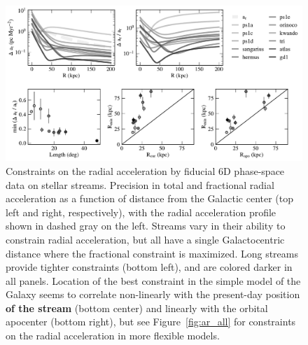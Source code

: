 \documentclass[modern]{aastex62}
\begin{document}
\begin{figure}
\begin{center}
\includegraphics[width=\textwidth]{ar_crb.pdf}
\caption{Constraints on the radial acceleration by fiducial 6D phase-space data on stellar streams.
Precision in total and fractional radial acceleration as a function of distance from the Galactic center (top left and right, respectively), with the radial acceleration profile shown in dashed gray on the left.
Streams vary in their ability to constrain radial acceleration, but all have a single Galactocentric distance where the fractional constraint is maximized.
Long streams provide tighter constraints (bottom left), and are colored darker in all panels.
Location of the best constraint in the simple model of the Galaxy seems to correlate non-linearly with the present-day position {\bf of the stream} (bottom center) and linearly with the orbital apocenter (bottom right), but see Figure~\ref{fig:ar_all} for constraints on the radial acceleration in more flexible models.
}
\label{fig:ar}
\end{center}
\end{figure}
\end{document}
